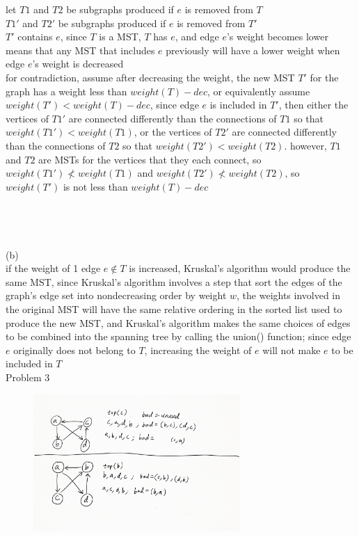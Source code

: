 \documentclass[12pt,border=4pt,multi]{article} %
\begin{document}
let $T1$ and $T2$ be subgraphs produced if $e$ is removed from $T$\\
$T1'$ and $T2'$ be subgraphs produced if $e$ is removed from $T'$\\
$T'$ contains $e$, since $T$ is a MST, $T$ has $e$, and edge $e$'s weight becomes lower means that any MST that includes $e$ previously will have a lower weight when edge $e$'s weight is decreased\\
for contradiction, assume after decreasing the weight, the new MST $T'$ for the graph has a weight less than $weight(T) - dec$, or equivalently assume $weight(T') < weight(T) - dec$, since edge $e$ is included in $T'$, then either the vertices of $T1'$ are connected differently than the connections of $T1$ so that $weight(T1') < weight(T1)$, or the vertices of $T2'$ are connected differently than the connections of $T2$ so that $weight(T2') < weight(T2)$. however, $T1$ and $T2$ are MSTs for the vertices that they each connect, so $weight(T1') \not< weight(T1)$ and $weight(T2') \not< weight(T2)$, so $weight(T')$ is not less than $weight(T) - dec$\\
\\
\\
\\
\\
(b)\\
if the weight of 1 edge $e \not\in T$ is increased, Kruskal's algorithm would produce the same MST, since Kruskal's algorithm involves a step that sort the edges of the graph's edge set into nondecreasing order by weight $w$, the weights involved in the original MST will have the same relative ordering in the sorted list used to produce the new MST, and Kruskal's algorithm makes the same choices of edges to be combined into the spanning tree by calling the union() function; since edge $e$ originally does not belong to $T$, increasing the weight of $e$ will not make $e$ to be included in $T$\\
\newpage
\noindent
Problem 3\\
\begin{figure}[h!]
	\centering
	\includegraphics[width=0.7\textwidth, height=0.65\textwidth]{3} %
\end{figure}\\
\end{document}
